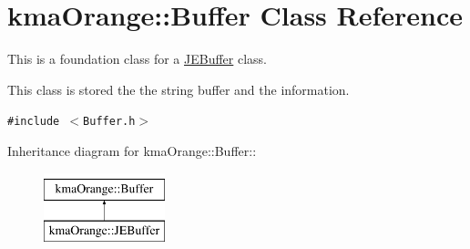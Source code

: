 \hypertarget{classkmaOrange_1_1Buffer}{
\section{kmaOrange::Buffer Class Reference}
\label{classkmaOrange_1_1Buffer}
}
This is a foundation class for a \hyperlink{classkmaOrange_1_1JEBuffer}{JEBuffer} class.\par
 This class is stored the the string buffer and the information.  


{\tt \#include $<$Buffer.h$>$}

Inheritance diagram for kmaOrange::Buffer::\begin{figure}[H]
\begin{center}
\leavevmode
\includegraphics[height=2cm]{classkmaOrange_1_1Buffer}
\end{center}
\end{figure}
